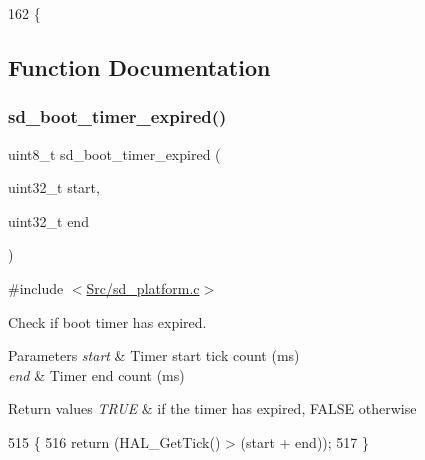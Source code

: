 \begin{DoxyCode}
162                   \{
\end{DoxyCode}


\subsection{Function Documentation}
\mbox{\label{group___s_d___platform_ga12d2befc51ccaa811a666d7eca5761ff}} 
\subsubsection{\texorpdfstring{sd\+\_\+boot\+\_\+timer\+\_\+expired()}{sd\_boot\_timer\_expired()}}
{\footnotesize\ttfamily uint8\+\_\+t sd\+\_\+boot\+\_\+timer\+\_\+expired (\begin{DoxyParamCaption}\item[{uint32\+\_\+t}]{start,  }\item[{uint32\+\_\+t}]{end }\end{DoxyParamCaption})}



{\ttfamily \#include $<$\mbox{\hyperlink{sd__platform_8c}{Src/sd\+\_\+platform.\+c}}$>$}



Check if boot timer has expired. 


\begin{DoxyParams}{Parameters}
{\em start} & Timer start tick count (ms) \\
\hline
{\em end} & Timer end count (ms) \\
\hline
\end{DoxyParams}

\begin{DoxyRetVals}{Return values}
{\em T\+R\+UE} & if the timer has expired, F\+A\+L\+SE otherwise \\
\hline
\end{DoxyRetVals}

\begin{DoxyCode}
515 \{
516     \textcolor{keywordflow}{return} (HAL\_GetTick() > (start + end));
517 \}
\end{DoxyCode}
